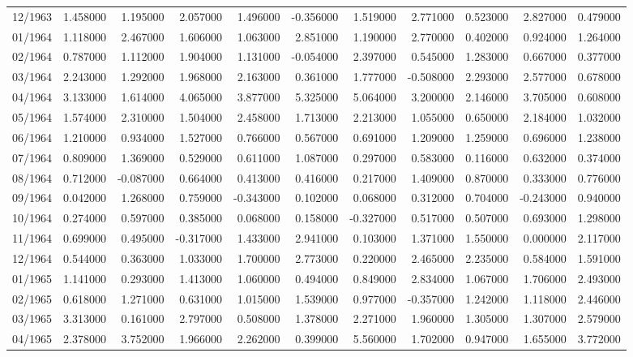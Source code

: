 \begin{tabular}{lrrrrrrrrrr}
12/1963 & 1.458000 & 1.195000 & 2.057000 & 1.496000 & -0.356000 & 1.519000 & 2.771000 & 0.523000 & 2.827000 & 0.479000 \\
01/1964 & 1.118000 & 2.467000 & 1.606000 & 1.063000 & 2.851000 & 1.190000 & 2.770000 & 0.402000 & 0.924000 & 1.264000 \\
02/1964 & 0.787000 & 1.112000 & 1.904000 & 1.131000 & -0.054000 & 2.397000 & 0.545000 & 1.283000 & 0.667000 & 0.377000 \\
03/1964 & 2.243000 & 1.292000 & 1.968000 & 2.163000 & 0.361000 & 1.777000 & -0.508000 & 2.293000 & 2.577000 & 0.678000 \\
04/1964 & 3.133000 & 1.614000 & 4.065000 & 3.877000 & 5.325000 & 5.064000 & 3.200000 & 2.146000 & 3.705000 & 0.608000 \\
05/1964 & 1.574000 & 2.310000 & 1.504000 & 2.458000 & 1.713000 & 2.213000 & 1.055000 & 0.650000 & 2.184000 & 1.032000 \\
06/1964 & 1.210000 & 0.934000 & 1.527000 & 0.766000 & 0.567000 & 0.691000 & 1.209000 & 1.259000 & 0.696000 & 1.238000 \\
07/1964 & 0.809000 & 1.369000 & 0.529000 & 0.611000 & 1.087000 & 0.297000 & 0.583000 & 0.116000 & 0.632000 & 0.374000 \\
08/1964 & 0.712000 & -0.087000 & 0.664000 & 0.413000 & 0.416000 & 0.217000 & 1.409000 & 0.870000 & 0.333000 & 0.776000 \\
09/1964 & 0.042000 & 1.268000 & 0.759000 & -0.343000 & 0.102000 & 0.068000 & 0.312000 & 0.704000 & -0.243000 & 0.940000 \\
10/1964 & 0.274000 & 0.597000 & 0.385000 & 0.068000 & 0.158000 & -0.327000 & 0.517000 & 0.507000 & 0.693000 & 1.298000 \\
11/1964 & 0.699000 & 0.495000 & -0.317000 & 1.433000 & 2.941000 & 0.103000 & 1.371000 & 1.550000 & 0.000000 & 2.117000 \\
12/1964 & 0.544000 & 0.363000 & 1.033000 & 1.700000 & 2.773000 & 0.220000 & 2.465000 & 2.235000 & 0.584000 & 1.591000 \\
01/1965 & 1.141000 & 0.293000 & 1.413000 & 1.060000 & 0.494000 & 0.849000 & 2.834000 & 1.067000 & 1.706000 & 2.493000 \\
02/1965 & 0.618000 & 1.271000 & 0.631000 & 1.015000 & 1.539000 & 0.977000 & -0.357000 & 1.242000 & 1.118000 & 2.446000 \\
03/1965 & 3.313000 & 0.161000 & 2.797000 & 0.508000 & 1.378000 & 2.271000 & 1.960000 & 1.305000 & 1.307000 & 2.579000 \\
04/1965 & 2.378000 & 3.752000 & 1.966000 & 2.262000 & 0.399000 & 5.560000 & 1.702000 & 0.947000 & 1.655000 & 3.772000 \\

\end{tabular}
